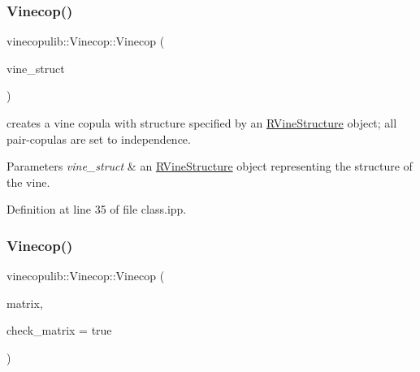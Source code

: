 \subsubsection{\texorpdfstring{Vinecop()}{Vinecop()}\hspace{0.1cm}{\footnotesize\ttfamily [2/13]}}
{\footnotesize\ttfamily vinecopulib\+::\+Vinecop\+::\+Vinecop (\begin{DoxyParamCaption}\item[{const \hyperlink{classvinecopulib_1_1_r_vine_structure}{R\+Vine\+Structure} \&}]{vine\+\_\+struct }\end{DoxyParamCaption})\hspace{0.3cm}{\ttfamily [inline]}}



creates a vine copula with structure specified by an \hyperlink{classvinecopulib_1_1_r_vine_structure}{R\+Vine\+Structure} object; all pair-\/copulas are set to independence. 


\begin{DoxyParams}{Parameters}
{\em vine\+\_\+struct} & an \hyperlink{classvinecopulib_1_1_r_vine_structure}{R\+Vine\+Structure} object representing the structure of the vine. \\
\hline
\end{DoxyParams}


Definition at line 35 of file class.\+ipp.

\mbox{\label{classvinecopulib_1_1_vinecop_a2cb5079a1a3cfe0403969aba92092ac3}} 
\subsubsection{\texorpdfstring{Vinecop()}{Vinecop()}\hspace{0.1cm}{\footnotesize\ttfamily [3/13]}}
{\footnotesize\ttfamily vinecopulib\+::\+Vinecop\+::\+Vinecop (\begin{DoxyParamCaption}\item[{const Eigen\+::\+Matrix$<$ size\+\_\+t, Eigen\+::\+Dynamic, Eigen\+::\+Dynamic $>$ \&}]{matrix,  }\item[{const bool}]{check\+\_\+matrix = {\ttfamily true} }\end{DoxyParamCaption})\hspace{0.3cm}{\ttfamily [inline]}}



